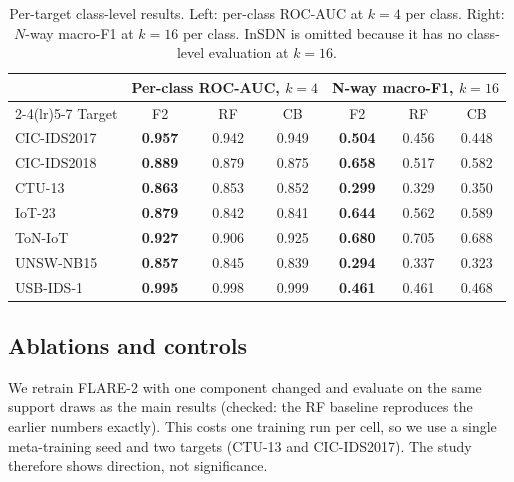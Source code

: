 \documentclass[pdflatex,sn-mathphys-num]{sn-jnl}%
\begin{document}
\begin{table}[htbp]
\centering\small
\caption{Per-target class-level results. Left: per-class ROC-AUC at $k=4$ per class. Right: $N$-way macro-F1 at $k=16$ per class. InSDN is omitted because it has no class-level evaluation at $k=16$.}\label{tab:classtarget}
{\scriptsize\setlength{\tabcolsep}{2.5pt}\begin{tabular}{lcccccc}
\toprule
& \multicolumn{3}{c}{Per-class ROC-AUC, $k{=}4$} & \multicolumn{3}{c}{N-way macro-F1, $k{=}16$} \\
\cmidrule(lr){2-4}\cmidrule(lr){5-7}
Target & F2 & RF & CB & F2 & RF & CB \\
\midrule
CIC-IDS2017 & \textbf{0.957} & 0.942 & 0.949 & \textbf{0.504} & 0.456 & 0.448 \\
CIC-IDS2018 & \textbf{0.889} & 0.879 & 0.875 & \textbf{0.658} & 0.517 & 0.582 \\
CTU-13 & \textbf{0.863} & 0.853 & 0.852 & \textbf{0.299} & 0.329 & 0.350 \\
IoT-23 & \textbf{0.879} & 0.842 & 0.841 & \textbf{0.644} & 0.562 & 0.589 \\
ToN-IoT & \textbf{0.927} & 0.906 & 0.925 & \textbf{0.680} & 0.705 & 0.688 \\
UNSW-NB15 & \textbf{0.857} & 0.845 & 0.839 & \textbf{0.294} & 0.337 & 0.323 \\
USB-IDS-1 & \textbf{0.995} & 0.998 & 0.999 & \textbf{0.461} & 0.461 & 0.468 \\
\bottomrule
\end{tabular}}
\end{table}

\subsection{Ablations and controls}\label{sec:ablation}
We retrain FLARE-2 with one component changed and evaluate on the same support draws as the main results (checked: the RF baseline reproduces the earlier numbers exactly).
This costs one training run per cell, so we use a single meta-training seed and two targets (CTU-13 and CIC-IDS2017).
The study therefore shows direction, not significance.
\end{document}

